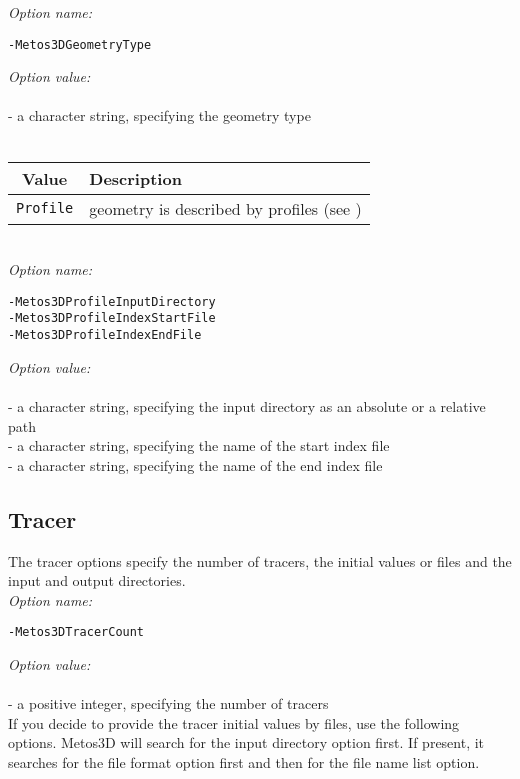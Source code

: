 \documentclass{article}
\begin{document}
\emph{Option name:}
\begin{verbatim}
-Metos3DGeometryType                                
\end{verbatim}

\emph{Option value:} \\
\vspace{-0.3cm}\\
- a character string, specifying the geometry type \\
\\
\begin{tabular}{c|l}
Value & Description \\ \hline
\texttt{Profile} & geometry is described by profiles (see \cite{KhViCa05})
\end{tabular} \\

\emph{Option name:}
\begin{verbatim}
-Metos3DProfileInputDirectory
-Metos3DProfileIndexStartFile
-Metos3DProfileIndexEndFile
\end{verbatim}

\emph{Option value:} \\
\vspace{-0.3cm}\\
- a character string, specifying the input directory as an absolute or a relative path \\
- a character string, specifying the name of the start index file \\
- a character string, specifying the name of the end index file

%
%
\subsection{Tracer}

The tracer options specify the number of tracers, the initial values or files and
the input and output directories. \\

\emph{Option name:}
\begin{verbatim}
-Metos3DTracerCount
\end{verbatim}

\emph{Option value:} \\
\vspace{-0.3cm}\\
- a positive integer, specifying the number of tracers \\

If you decide to provide the tracer initial values by files,
use the following options. Metos3D will search for the input directory option
first. If present, it searches for the file format option first and then
for the file name list option. \\
\end{document}
